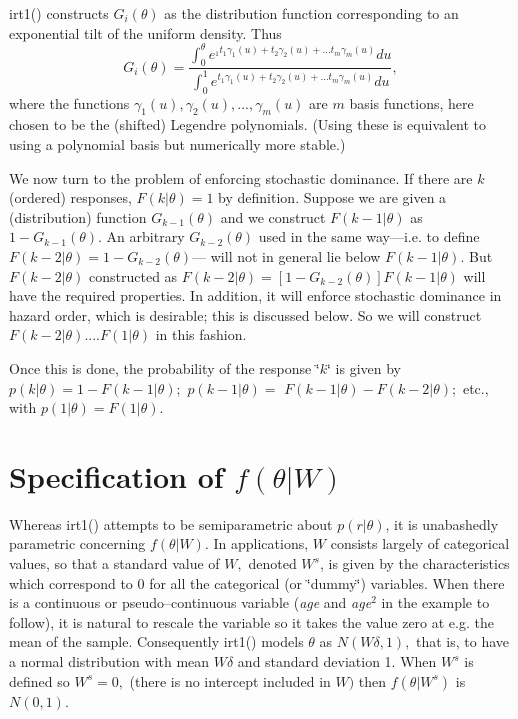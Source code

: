 \documentclass{amsart}
\begin{document}
irt1() constructs $G_{i}(\theta)$ as the distribution function corresponding
to an exponential tilt of the uniform density. Thus \[
G_{i}(\theta)=\frac{\int_{0}^{\theta}e^{_{1}t_{1}\gamma_{1}(u)+t_{2}\gamma_{2}(u)+...t_{m}\gamma_{m}(u)}du}{\int_{0}^{1}e^{t_{1}\gamma_{1}(u)+t_{2}\gamma_{2}(u)+...t_{m}\gamma_{m}(u)}du},\]
where the functions $\gamma_{1}(u),\gamma_{2}(u),...,\gamma_{m}(u)$
are $m$ basis functions, here chosen to be the (shifted) Legendre
polynomials. (Using these is equivalent to using a polynomial basis
but numerically more stable.)

We now turn to the problem of enforcing stochastic dominance. If there
are $k$ (ordered) responses, $F(k|\theta)=1$ by definition. Suppose
we are given a (distribution) function $G_{k-1}(\theta)$ and we construct
$F(k-1|\theta)$ as $1-G_{k-1}(\theta).$ An arbitrary $G_{k-2}(\theta)$
used in the same way---i.e. to define $F(k-2|\theta)=1-G_{k-2}(\theta)$---
will not in general lie below $F(k-1|\theta).$ But $F(k-2|\theta)$
constructed as $F(k-2|\theta)=[1-G_{k-2}(\theta)]F(k-1|\theta)$ will
have the required properties. In addition, it will enforce stochastic
dominance in hazard order, which is desirable; this is discussed below.
So we will construct $F(k-2|\theta)....F(1|\theta)$ in this fashion.

Once this is done, the probability of the response \char`\"{}$k$\char`\"{}
is given by $p(k|\theta)=1-F(k-1|\theta);$ $p(k-1|\theta)=$ $F(k-1|\theta)-F(k-2|\theta);$
etc., with $p(1|\theta)=F(1|\theta).$

\section{Specification of $f(\theta|W)$ }

Whereas irt1() attempts to be semiparametric about $p(r|\theta)$,
it is unabashedly parametric concerning $f(\theta|W).$ In applications,
$W$ consists largely of categorical values, so that a standard value
of $W,$ denoted $W^{s}$, is given by the characteristics which correspond
to 0 for all the categorical (or \char`\"{}dummy\char`\"{}) variables.
When there is a continuous or pseudo--continuous variable (\emph{age}
and \emph{age}$^{2}$ in the example to follow), it is natural to
rescale the variable so it takes the value zero at e.g. the mean of
the sample. Consequently irt1() models $\theta$ as $N(W\delta,1),$
that is, to have a normal distribution with mean $W\delta$ and standard
deviation 1. When $W^{s}$ is defined so $W^{s}=0,$ (there is no
intercept included in $W)$ then $f(\theta|W^{s})$ is $N(0,1).$
\end{document}
